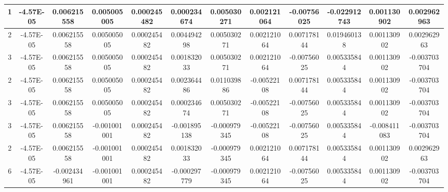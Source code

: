 \documentclass[UTF8]{ctexart}
\begin{document}
\begin{itemize}
\begin{itemize}
\begin{table}[!ht]
{{\begin{tabular}{|c|c|c|c|c|c|c|c|c|c|c|c|}
						            1        & -4.57E-05   & 0.006215558  & 0.005005005  & 0.000245482   & 0.000234674  & 0.005030271  & 0.002121064  & -0.00756025 & -0.022912743 & 0.001130902  & 0.002962963  \\ \hline
						            2        & -4.57E-05   & 0.006215558  & 0.005005005  & 0.000245482   & 0.004494298  & 0.005030271  & 0.002121064  & 0.007178144 & 0.019460138  & 0.001130902  & 0.002962963  \\ \hline
						            3        & -4.57E-05   & 0.006215558  & 0.005005005  & 0.000245482   & 0.001832033  & 0.005030271  & 0.002121064  & -0.00756025 & 0.005335844  & 0.001130902  & -0.003703704 \\ \hline
						            2        & -4.57E-05   & 0.006215558  & 0.005005005  & 0.000245482   & 0.002364486  & 0.011039886  & -0.00522108  & 0.007178144 & 0.005335844  & 0.001130902  & -0.003703704 \\ \hline
						            3        & -4.57E-05   & 0.006215558  & 0.005005005  & 0.000245482   & 0.000234674  & 0.005030271  & -0.00522108  & -0.00756025 & 0.005335844  & 0.001130902  & -0.003703704 \\ \hline
						            3        & -4.57E-05   & 0.006215558  & -0.001001001 & 0.000245482   & -0.001895138 & -0.000979345 & -0.00522108  & -0.00756025 & 0.005335844  & -0.008411083 & -0.003703704 \\ \hline
						            2        & -4.57E-05   & 0.006215558  & -0.001001001 & 0.000245482   & 0.001832033  & -0.000979345 & 0.002121064  & 0.007178144 & 0.005335844  & 0.001130902  & 0.002962963  \\ \hline
						            6        & -4.57E-05   & -0.002434961 & -0.001001001 & 0.000245482   & -0.000297779 & -0.000979345 & 0.002121064  & -0.00756025 & 0.005335844  & 0.001130902  & -0.003703704 \\ \hline
					            \end{tabular}}}
		            \end{table}


\end{itemize}
\end{itemize}
\end{document}
